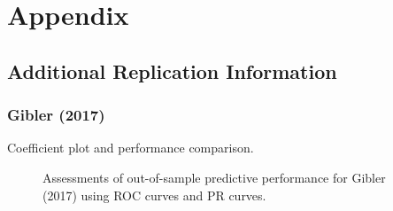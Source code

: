 \clearpage

\renewcommand{\thefigure}{A\arabic{figure}}
\setcounter{figure}{0}
\renewcommand{\thetable}{A.\arabic{table}}
\setcounter{table}{0}
\renewcommand{\thesection}{A.\arabic{section}}
\setcounter{section}{0}

\section*{\textbf{Appendix}}

\subsection*{Additional Replication Information}

\subsubsection*{Gibler (2017)}

Coefficient plot and performance comparison.


\FloatBarrier

\begin{figure}
	\centering   
	\caption{Assessments of out-of-sample predictive performance for Gibler (2017) using ROC curves and PR curves.}
\end{figure}
\FloatBarrier

